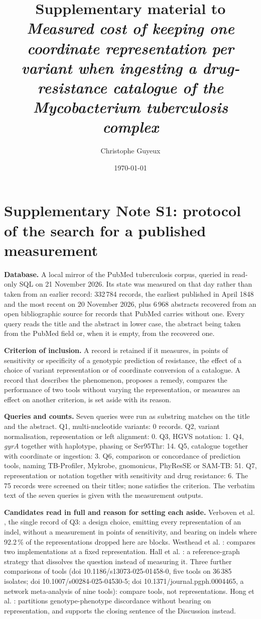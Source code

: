 \documentclass[11pt]{article}
\title{Supplementary material to \textit{Measured cost of keeping one coordinate representation
per variant when ingesting a drug-resistance catalogue of the \textit{Mycobacterium
tuberculosis} complex}}
\author{Christophe Guyeux}
\date{\today}
\begin{document}
\maketitle

\section*{Supplementary Note S1: protocol of the search for a published measurement}

\textbf{Database.} A local mirror of the PubMed tuberculosis corpus, queried in read-only SQL
on 21 November 2026. Its state was measured on that day rather than taken from an earlier
record: 332\,784 records, the earliest published in April 1848 and the most recent on 20
November 2026, plus 6\,968 abstracts recovered from an open bibliographic source for records
that PubMed carries without one. Every query reads the title and the abstract in lower case,
the abstract being taken from the PubMed field or, when it is empty, from the recovered one.

\textbf{Criterion of inclusion.} A record is retained if it measures, in points of sensitivity
or specificity of a genotypic prediction of resistance, the effect of a choice of variant
representation or of coordinate conversion of a catalogue. A record that describes the
phenomenon, proposes a remedy, compares the performance of two tools without varying the
representation, or measures an effect on another criterion, is set aside with its reason.

\textbf{Queries and counts.} Seven queries were run as substring matches on the title and the
abstract. Q1, multi-nucleotide variants: 0 records. Q2, variant normalisation, representation
or left alignment: 0. Q3, HGVS notation: 1. Q4, \textit{gyrA} together with haplotype, phasing
or Ser95Thr: 14. Q5, catalogue together with coordinate or ingestion: 3. Q6, comparison or
concordance of prediction tools, naming TB-Profiler, Mykrobe, gnomonicus, PhyResSE or SAM-TB:
51. Q7, representation or notation together with sensitivity and drug resistance: 6. The 75
records were screened on their titles; none satisfies the criterion. The verbatim text of the
seven queries is given with the measurement outputs.

\textbf{Candidates read in full and reason for setting each aside.} Verboven et
al. \cite{verboven2022}, the single record of Q3: a design choice, emitting every
representation of an indel, without a measurement in points of sensitivity, and bearing on
indels where 92.2\,\% of the representations dropped here are blocks. Westhead et
al. \cite{westhead2025}: compares two implementations at a fixed representation. Hall et
al. \cite{drprg2023}: a reference-graph strategy that dissolves the question instead of
measuring it. Three further comparisons of tools (doi 10.1186/s13073-025-01458-0, five tools
on 36\,385 isolates; doi 10.1007/s00284-025-04530-5; doi 10.1371/journal.pgph.0004465, a
network meta-analysis of nine tools): compare tools, not representations. Hong et
al. \cite{hong2026}: partitions genotype-phenotype discordance without bearing on
representation, and supports the closing sentence of the Discussion instead.
\end{document}

